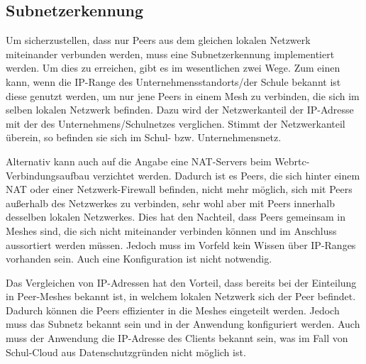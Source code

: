 %
\subsection{Subnetzerkennung}

Um sicherzustellen, dass nur Peers aus dem gleichen lokalen Netzwerk miteinander verbunden werden, muss eine Subnetzerkennung implementiert werden.
Um dies zu erreichen, gibt es im wesentlichen zwei Wege. Zum einen kann, wenn die IP-Range des Unternehmensstandorts/der Schule bekannt ist diese genutzt werden, um nur jene Peers in einem Mesh zu verbinden, die sich im selben lokalen Netzwerk befinden. Dazu wird der Netzwerkanteil der IP-Adresse mit der des Unternehmens/Schulnetzes verglichen. Stimmt der Netzwerkanteil überein, so befinden sie sich im Schul- bzw. Unternehmensnetz.

Alternativ kann auch auf die Angabe eine NAT-Servers beim Webrtc-Verbindungsaufbau verzichtet werden. Dadurch ist es Peers, die sich hinter einem NAT oder einer Netzwerk-Firewall befinden, nicht mehr möglich, sich mit Peers außerhalb des Netzwerkes zu verbinden, sehr wohl aber mit Peers innerhalb desselben lokalen Netzwerkes. Dies hat den Nachteil, dass Peers gemeinsam in Meshes sind, die sich nicht miteinander verbinden können und im Anschluss aussortiert werden müssen. Jedoch muss im Vorfeld kein Wissen über IP-Ranges vorhanden sein. Auch eine Konfiguration ist nicht notwendig.

Das Vergleichen von IP-Adressen hat den Vorteil, dass bereits bei der Einteilung in Peer-Meshes bekannt ist, in welchem lokalen Netzwerk sich der Peer befindet. Dadurch können die Peers effizienter in die Meshes eingeteilt werden. Jedoch muss das Subnetz bekannt sein und in der Anwendung konfiguriert werden. Auch muss der Anwendung die IP-Adresse des Clients bekannt sein, was im Fall von Schul-Cloud aus Datenschutzgründen nicht möglich ist.

